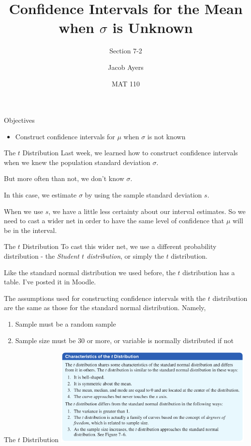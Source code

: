 \documentclass[t, aspectratio=169]{beamer}
\title[7-2]{Confidence Intervals for the Mean when $\sigma$ is Unknown}
\subtitle{Section 7-2}
\author{Jacob Ayers}
\institute{Lesson \#22}
\date{MAT 110}
\newcommand{\?}{\stackrel{?}{=}}
\begin{document}
	
	\begin{frame}
		\titlepage
	\end{frame}
	
	\begin{frame}{Objectives}
		\begin{itemize}
			\item Construct confidence intervals for $\mu$ when $\sigma$ is not known
		\end{itemize}
	\end{frame}

	\begin{frame}{The $t$ Distribution}
		Last week, we learned how to construct confidence intervals when we knew the population standard deviation $\sigma$. \pause
		
		But more often than not, we don't know $\sigma$. \pause
		
		In this case, we estimate $\sigma$ by using the sample standard deviation $s$. \pause
		
		When we use $s$, we have a little less certainty about our interval estimates. So we need to cast a wider net in order to have the same level of confidence that $\mu$ will be in the interval.
	\end{frame}

	\begin{frame}{The $t$ Distribution}
		To cast this wider net, we use a different probability distribution - the \textit{Student $t$ distribution}, or simply the $t$ distribution. \pause
		
		Like the standard normal distribution we used before, the $t$ distribution has a table. I've posted it in Moodle. \pause
		
		The assumptions used for constructing confidence intervals with the $t$ distribution are the same as those for the standard normal distribution. Namely, \begin{enumerate}[1)]
			\item Sample must be a random sample
			\item Sample size must be 30 or more, or variable is normally distributed if not
		\end{enumerate}
	\end{frame}

	\begin{frame}{The $t$ Distribution}
		\includegraphics[width=0.75\textwidth]{t-char.png}
	\end{frame}
\end{document}
